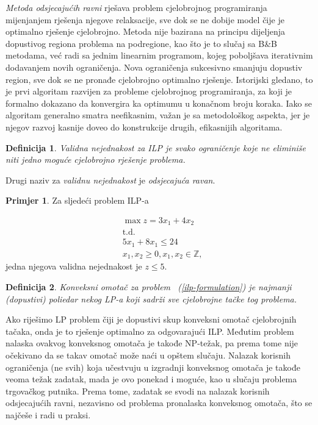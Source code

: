 \documentclass[a4paper, utf8, 11pt, colorlinks]{book}
\newtheorem{definition}{Definicija}[chapter]
\theoremstyle{definition}
\newtheorem{primjer}{Primjer}[chapter]
\begin{document}
\emph{Metoda odsjecajućih ravni} rješava problem cjelobrojnog  programiranja mijenjanjem rješenja njegove relaksacije, sve dok se ne dobije model čije je optimalno rješenje cjelobrojno. Metoda nije bazirana na principu dijeljenja dopustivog regiona problema na podregione, kao što je to slučaj sa B\&B metodama, već radi sa jednim linearnim programom, kojeg poboljšava iterativnim dodavanjem novih ograničenja. Nova ograničenja sukcesivno smanjuju dopustiv region, sve dok se ne pronađe cjelobrojno optimalno rješenje.   
 Istorijski gledano, to je prvi algoritam razvijen za probleme cjelobrojnog programiranja, za koji je formalno dokazano da konvergira ka optimumu u konačnom broju koraka. Iako se algoritam generalno smatra   neefikasnim, važan je sa metodološkog aspekta, jer je njegov razvoj kasnije doveo do konstrukcije drugih, efikasnijih algoritama.  
  
 \begin{definition}{Validna nejednakost} za ILP je svako ograničenje koje ne eliminiše niti   jedno moguće cjelobrojno rješenje problema.
 \end{definition}
 Drugi naziv za \emph{validnu nejednakost} je \emph{odsjecajuća ravan}.

\begin{primjer}
Za sljedeći problem ILP-a
\end{primjer}
\begin{align*}
    &\max z = 3x_1 + 4 x_2 \\
    &\mbox{t.d.} \\
    &5x_1 + 8x_1 \leq 24 \\
    & x_1, x_2 \geq 0, x_1,x_2\in \mathbb{Z},
\end{align*}
jedna njegova validna nejednakost je $z \leq 5$. 

\begin{definition}
      Konveksni omotač za problem  ~(\ref{ilp-formulation}) je najmanji (dopustivi) poliedar nekog LP-a koji sadrži sve cjelobrojne tačke tog problema.
\end{definition}
Ako riješimo LP problem čiji je dopustivi skup konveksni omotač cjelobrojnih tačaka, onda je to rješenje optimalno za odgovarajući ILP. Međutim problem nalaska ovakvog konveksnog omotača je takođe  NP-težak, pa prema tome nije očekivano da se takav   omotač može naći u opštem slučaju. Nalazak korisnih ograničenja (ne svih) koja učestvuju u izgradnji konveksnog omotača je takođe veoma težak zadatak, mada je ovo ponekad i moguće, kao u slučaju problema trgovačkog putnika. Prema tome, zadatak se svodi na nalazak korisnih odsjecajućih ravni, nezavisno od problema pronalaska konveksnog omotača, što se najčeše i radi  u praksi. 
\end{document}
